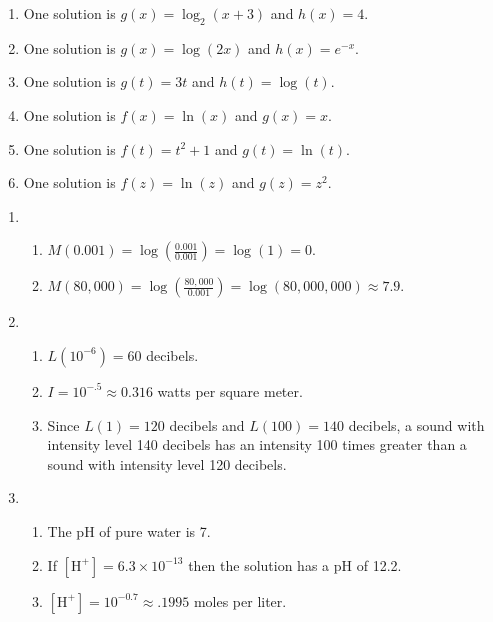 \documentclass{ximera}
\begin{document}
\begin{enumerate}
\setcounter{enumi}{\value{HW}}

\item  One solution is $g(x) = \log_{2}(x+3)$ and $h(x) = 4$.
\item  One solution is $g(x) = \log(2x)$ and $h(x) = e^{-x}$. 
\item  One solution is $g(t) = 3t$ and $h(t) = \log(t)$.
\item  One solution is $f(x) = \ln(x)$ and $g(x)=x$.
\item  One solution is $f(t) = t^2+1$ and $g(t) = \ln(t)$.
\item  One solution is $f(z) = \ln(z)$ and $g(z) = z^2$. 

\setcounter{HW}{\value{enumi}}
\end{enumerate}


\begin{enumerate}
\setcounter{enumi}{\value{HW}}


\item \begin{enumerate}

\item $M(0.001) = \log \left(\frac{0.001}{0.001} \right) = \log(1) = 0$.
\item $M(80,000) = \log \left(\frac{80,000}{0.001} \right) = \log(80,000,000) \approx 7.9$.

\end{enumerate}

\item \begin{enumerate}

\item $L(10^{-6}) = 60$ decibels.
\item $I = 10^{-.5} \approx 0.316$ watts per square meter.
\item Since $L(1) = 120$ decibels and $L(100) = 140$ decibels, a sound with intensity level 140 decibels has an intensity 100 times greater than a sound with intensity level 120 decibels.

\end{enumerate}

\item \begin{enumerate}

\item The pH of pure water is 7.
\item If $[\mbox{H}^{+}] = 6.3 \times 10^{-13}$ then the solution has a pH of 12.2.
\item $[\mbox{H}^{+}] = 10^{-0.7} \approx .1995$ moles per liter.

\end{enumerate}
\setcounter{HW}{\value{enumi}}
\end{enumerate}
\end{document}
